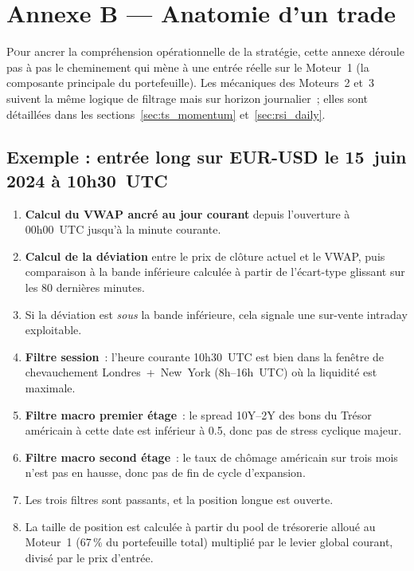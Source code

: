 \section{Annexe B --- Anatomie d'un trade}
\label{app:signal_flow}

\lettrine[lines=2, findent=2pt, nindent=0pt]{P}{o}ur ancrer la compréhension opérationnelle de la stratégie, cette annexe déroule pas à pas le cheminement qui mène à une entrée réelle sur le Moteur~1 (la composante principale du portefeuille). Les mécaniques des Moteurs~2 et~3 suivent la même logique de filtrage mais sur horizon journalier~; elles sont détaillées dans les sections~\ref{sec:ts_momentum} et~\ref{sec:rsi_daily}.

\subsection*{Exemple : entrée long sur EUR-USD le 15~juin 2024 à 10h30~UTC}

\begin{enumerate}
\item \textbf{Calcul du VWAP ancré au jour courant} depuis l'ouverture à 00h00~UTC jusqu'à la minute courante.
\item \textbf{Calcul de la déviation} entre le prix de clôture actuel et le VWAP, puis comparaison à la bande inférieure calculée à partir de l'écart-type glissant sur les 80 dernières minutes.
\item Si la déviation est \emph{sous} la bande inférieure, cela signale une sur-vente intraday exploitable.
\item \textbf{Filtre session}~: l'heure courante 10h30~UTC est bien dans la fenêtre de chevauchement Londres~+~New~York (8h--16h~UTC) où la liquidité est maximale.
\item \textbf{Filtre macro premier étage}~: le spread 10Y--2Y des bons du Trésor américain à cette date est inférieur à 0.5, donc pas de stress cyclique majeur.
\item \textbf{Filtre macro second étage}~: le taux de chômage américain sur trois mois n'est pas en hausse, donc pas de fin de cycle d'expansion.
\item Les trois filtres sont passants, et la position longue est ouverte.
\item La taille de position est calculée à partir du pool de trésorerie alloué au Moteur~1 (67\,\% du portefeuille total) multiplié par le levier global courant, divisé par le prix d'entrée.
\end{enumerate}

